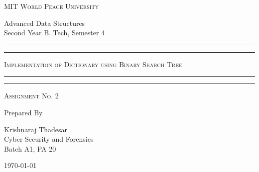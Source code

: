 \documentclass[11pt]{article}
\begin{document}
\begin{titlepage}
	\centering


	\huge\textsc{
		MIT World Peace University
	}\\

	\vspace{0.75\baselineskip} %

	\LARGE{
		Advanced Data Structures\\
		Second Year B. Tech, Semester 4
	}

	\vfill %


	\rule{\textwidth}{1.6pt}\vspace*{-\baselineskip}\vspace*{2pt}
	\rule{\textwidth}{0.6pt}
	\vspace{0.75\baselineskip} %



	\huge{\textsc{
			Implementation of Dictionary using Binary Search Tree
		}} \\



	\vspace{0.5\baselineskip} %
	\rule{\textwidth}{0.6pt}\vspace*{-\baselineskip}\vspace*{2.8pt}
	\rule{\textwidth}{1.6pt}

	\vspace{1\baselineskip} %


	\LARGE\textsc{
		Assignment No. 2
	} %
	\vfill


	Prepared By
	\vspace{0.5\baselineskip} %

	\Large{
		Krishnaraj Thadesar \\
		Cyber Security and Forensics\\
		Batch A1, PA 20
	}


	\vspace{0.5\baselineskip} %
	\today

\end{titlepage}
\end{document}
